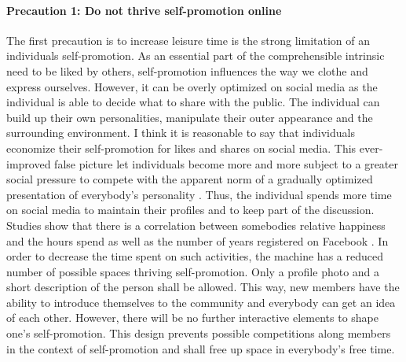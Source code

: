\documentclass[12pt,numbers=noenddot,parskip,bibliography=totocnumbered,listof=totocnumbered,draft]{scrreprt}
\begin{document}
\paragraph{Precaution 1: Do not thrive self-promotion online}
The first precaution is to increase leisure time is the strong limitation of an individuals self-promotion. As an essential part of the comprehensible intrinsic need to be liked by others, self-promotion influences the way we clothe and express ourselves. However, it can be overly optimized on social media as the individual is able to decide what to share with the public. The individual can build up their own personalities, manipulate their outer appearance and the surrounding environment. I think it is reasonable to say that individuals economize their self-promotion for likes and shares on social media. This ever-improved false picture let individuals become more and more subject to a greater social pressure to compete with the apparent norm of a gradually optimized presentation of everybody's personality \citep{jay2012}. Thus, the individual spends more time on social media to maintain their profiles and to keep part of the discussion. Studies show that there is a correlation between somebodies relative happiness and the hours spend as well as the number of years registered on Facebook \citep[p.119]{chou2012}.\newline
In order to decrease the time spent on such activities, the machine has a reduced number of possible spaces thriving self-promotion. Only a profile photo and a short description of the person shall be allowed. This way, new members have the ability to introduce themselves to the community and everybody can get an idea of each other. However, there will be no further interactive elements to shape one's self-promotion. This design prevents possible competitions along members in the context of self-promotion and shall free up space in everybody's free time.
\end{document}

